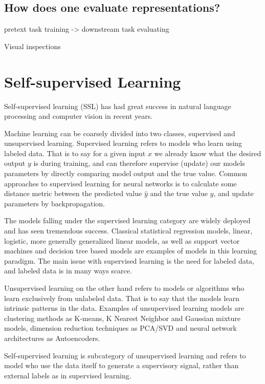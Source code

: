 \documentclass[../../thesis.tex]{subfiles}
\begin{document}
\subsection{How does one evaluate representations?}


pretext task training -> downstream task evaluating

Visual inspections

\cite{nozawa2022empirical}





\section{Self-supervised Learning}
Self-supervised learning (SSL) has had great success in natural language processing and computer vision in recent years. 

Machine learning can be coarsely divided into two classes, supervised and unsupervised learning. Supervised learning refers to models who learn using labeled data. That is to say for a given input $x$ we already know what the desired output $y$ is during training, and can therefore supervise (update) our models parameters by directly comparing model output and the true value. Common approaches to supervised learning for neural networks is to calculate some distance metric between the predicted value $\hat{y}$ and the true value $y$, and update parameters by backpropagation.

The models falling under the supervised learning category are widely deployed and has seen tremendous success. Classical statistical regression models, linear, logistic, more generally generalized linear models, as well as support vector machines and decision tree based models are examples of models in this learning paradigm. The main issue with supervised learning is the need for labeled data, and labeled data is in many ways scarce. 

Unsupervised learning on the other hand refers to models or algorithms who learn exclusively from unlabeled data. That is to say that the models learn intrinsic patterns in the data. Examples of unsupervised learning models are clustering methods as K-means, K Nearest Neighbor and Gaussian mixture models, dimension reduction techniques as PCA/SVD and neural network architectures as Autoencoders. 


Self-supervised learning is subcategory of unsupervised learning and refers to model who use the data itself to generate a supervisory signal, rather than external labels as in supervised learning. \\\\
\end{document}
